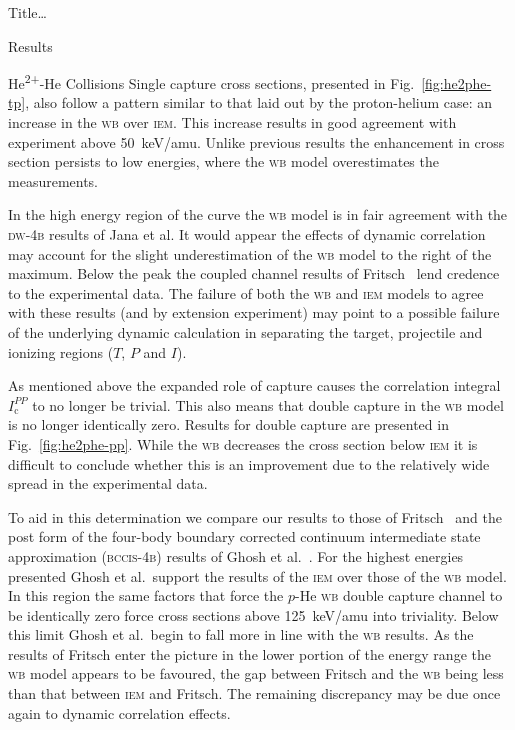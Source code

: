\documentclass[letterpaper, 11 pt]{report}
\begin{document}
\begin{chapter}{ Title\dots \label{chap:p-he2p-he}}
\begin{section}{Results \label{sec:phe2p-res}}
\begin{subsection}{\texorpdfstring{He\textsuperscript{2+}}{He2+}-He Collisions 
                         \label{sec:he2phe-res}}
         Single capture cross sections, presented in Fig.~\ref{fig:he2phe-tp}, also follow a pattern
         similar to that laid out by the proton-helium case: an increase in the \textsc{wb} over
         \textsc{iem}. This increase results in good agreement with experiment above 50~keV/amu. Unlike
         previous results the enhancement in cross section persists to low energies, where the
         \textsc{wb} model overestimates the  measurements.

         In the high energy region of the curve the \textsc{wb} model is in fair agreement with the
         \textsc{dw-4b} results of Jana et al. It would appear the effects of dynamic correlation may
         account for the slight underestimation of the \textsc{wb} model to the right of the maximum.
         Below the peak the coupled channel results of Fritsch~\cite{Fritsch-94} lend credence to the
         experimental data. The failure of both the \textsc{wb} and \textsc{iem} models to agree with
         these results (and by extension experiment) may point to a possible failure of the underlying
         dynamic calculation in separating the target, projectile and ionizing regions ($T$, $P$ and
         $I$).

         As mentioned above the expanded role of capture causes the correlation integral
         $I^{PP}_\mathrm{c}$ to no longer be trivial. This also means that double capture in the
         \textsc{wb} model is no longer identically zero. Results for double capture are presented in
         Fig.~\ref{fig:he2phe-pp}. While the \textsc{wb} decreases the cross section below \textsc{iem}
         it is difficult to conclude whether this is an improvement due to the relatively wide spread in
         the experimental data.

         To aid in this determination we compare our results to those of Fritsch~\cite{Fritsch-94} and
         the post form of the four-body boundary corrected continuum intermediate state approximation
         (\textsc{bccis-4b}) results of Ghosh et al.~\cite{GDMP-08}. For the highest energies presented
         Ghosh et al.\ support the results of the \textsc{iem} over those of the \textsc{wb} model. In
         this region the same factors that force the $p$-He \textsc{wb} double capture channel to be
         identically zero force cross sections above 125~keV/amu into triviality. Below this limit Ghosh
         et al.\ begin to fall more in line with the \textsc{wb} results. As the results of Fritsch
         enter the picture in the lower portion of the energy range the \textsc{wb} model appears to be
         favoured, the gap between Fritsch and the \textsc{wb} being less than that between \textsc{iem}
         and Fritsch. The remaining discrepancy may be due once again to dynamic correlation effects.


\end{subsection}
\end{section}
\end{chapter}
\end{document}
